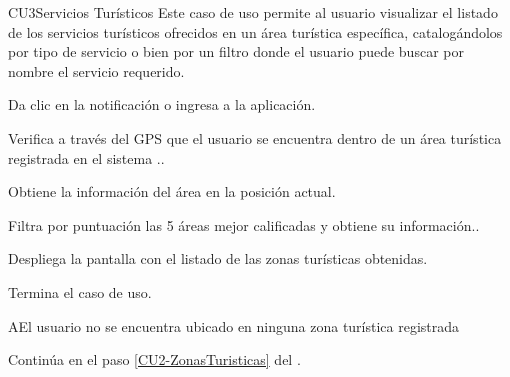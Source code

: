 
% 



	\begin{UseCase}{CU3}{Servicios Turísticos}{
		Este caso de uso permite al usuario visualizar el listado de los servicios turísticos ofrecidos en un área turística específica, catalogándolos por tipo de servicio o bien por un filtro donde el usuario puede buscar por nombre el servicio requerido. 
	}
	\end{UseCase}
	\begin{UCtrayectoria} 
		\UCpaso[\UCactor] Da clic en la notificación o ingresa a la aplicación.
		
		\UCpaso Verifica a través del GPS que el usuario se encuentra dentro de un área turística registrada en el sistema ..
		
		\UCpaso Obtiene la información del área en la posición actual.
		
		\UCpaso Filtra por puntuación las 5 áreas mejor calificadas y obtiene su información.\label{CU2-ZonasTuristicas}.
		
		\UCpaso Despliega la pantalla  con el listado de las zonas turísticas obtenidas.

		\UCpaso[] Termina el caso de uso.
		
	\end{UCtrayectoria}

		\begin{UCtrayectoriaA}{A}{El usuario no se encuentra ubicado en ninguna zona turística registrada}
			
			\UCpaso Continúa en el paso \ref{CU2-ZonasTuristicas} del .
			
		\end{UCtrayectoriaA}
	
	